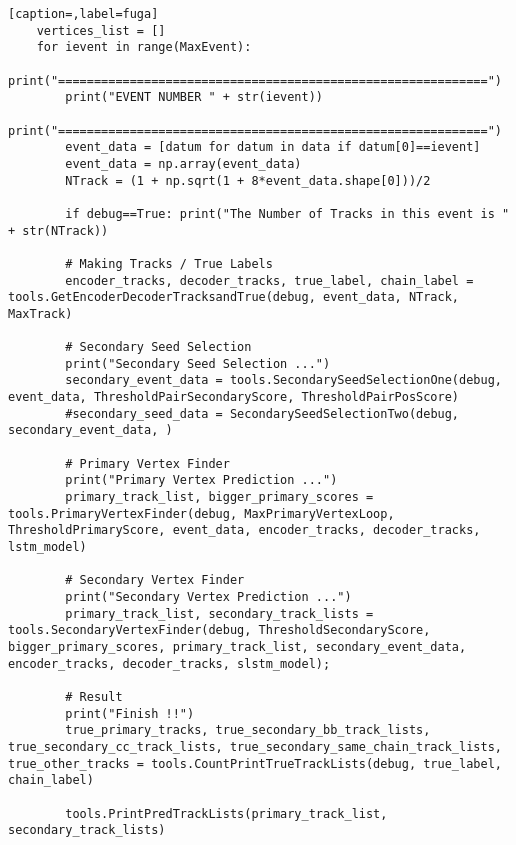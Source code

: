 \begin{lstlisting}[caption=,label=fuga]
    vertices_list = []
    for ievent in range(MaxEvent):
        print("============================================================")
        print("EVENT NUMBER " + str(ievent))
        print("============================================================")
        event_data = [datum for datum in data if datum[0]==ievent]
        event_data = np.array(event_data)
        NTrack = (1 + np.sqrt(1 + 8*event_data.shape[0]))/2 
        
        if debug==True: print("The Number of Tracks in this event is " + str(NTrack))

        # Making Tracks / True Labels 
        encoder_tracks, decoder_tracks, true_label, chain_label = tools.GetEncoderDecoderTracksandTrue(debug, event_data, NTrack, MaxTrack)

        # Secondary Seed Selection
        print("Secondary Seed Selection ...")
        secondary_event_data = tools.SecondarySeedSelectionOne(debug, event_data, ThresholdPairSecondaryScore, ThresholdPairPosScore)
        #secondary_seed_data = SecondarySeedSelectionTwo(debug, secondary_event_data, )

        # Primary Vertex Finder 
        print("Primary Vertex Prediction ...")
        primary_track_list, bigger_primary_scores = tools.PrimaryVertexFinder(debug, MaxPrimaryVertexLoop, ThresholdPrimaryScore, event_data, encoder_tracks, decoder_tracks, lstm_model)

        # Secondary Vertex Finder 
        print("Secondary Vertex Prediction ...")
        primary_track_list, secondary_track_lists = tools.SecondaryVertexFinder(debug, ThresholdSecondaryScore, bigger_primary_scores, primary_track_list, secondary_event_data, encoder_tracks, decoder_tracks, slstm_model);

        # Result 
        print("Finish !!")
        true_primary_tracks, true_secondary_bb_track_lists, true_secondary_cc_track_lists, true_secondary_same_chain_track_lists, true_other_tracks = tools.CountPrintTrueTrackLists(debug, true_label, chain_label)
        
        tools.PrintPredTrackLists(primary_track_list, secondary_track_lists)


\end{lstlisting}

